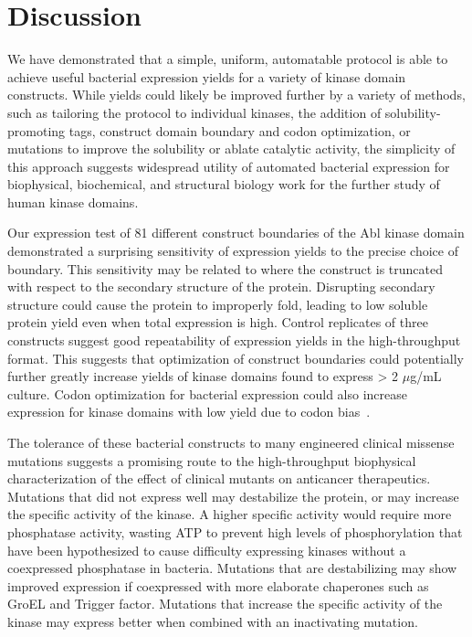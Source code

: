\documentclass[9pt,lineno]{elife}
\begin{document}
\section{Discussion}
\label{section:discussion}

We have demonstrated that a simple, uniform, automatable protocol is able to achieve useful bacterial expression yields for a variety of kinase domain constructs.
While yields could likely be improved further by a variety of methods, such as tailoring the protocol to individual kinases, the addition of solubility-promoting tags, construct domain boundary and codon optimization, or mutations to improve the solubility or ablate catalytic activity, the simplicity of this approach suggests widespread utility of automated bacterial expression for biophysical, biochemical, and structural biology work for the further study of human kinase domains.

Our expression test of 81 different construct boundaries of the Abl kinase domain demonstrated a surprising sensitivity of expression yields to the precise choice of boundary. This sensitivity may be related to where the construct is truncated with respect to the secondary structure of the protein. Disrupting secondary structure could cause the protein to improperly fold, leading to low soluble protein yield even when total expression is high. Control replicates of three constructs suggest good repeatability of expression yields in the high-throughput format. This suggests that optimization of construct boundaries could potentially further greatly increase yields of kinase domains found to express > 2 $\mu$g/mL culture. Codon optimization for bacterial expression could also increase expression for kinase domains with low yield due to codon bias~\citep{SORENSEN2005113}. 

The tolerance of these bacterial constructs to many engineered clinical missense mutations suggests a promising route to the high-throughput biophysical characterization of the effect of clinical mutants on anticancer therapeutics. Mutations that did not express well may destabilize the protein, or may increase the specific activity of the kinase. A higher specific activity would require more phosphatase activity, wasting ATP to prevent high levels of phosphorylation that have been hypothesized to cause difficulty expressing kinases without a coexpressed phosphatase in bacteria. Mutations that are destabilizing may show improved expression if coexpressed with more elaborate chaperones such as GroEL and Trigger factor. Mutations that increase the specific activity of the kinase may express better when combined with an inactivating mutation.  
\end{document}
